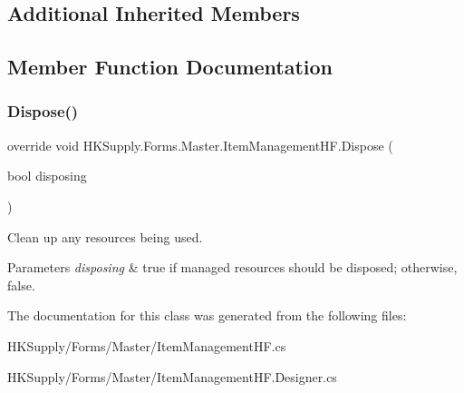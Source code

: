 \subsection*{Additional Inherited Members}


\subsection{Member Function Documentation}
\mbox{\label{class_h_k_supply_1_1_forms_1_1_master_1_1_item_management_h_f_a5110e62d48874b23703c69ef3d70e727}} 
\subsubsection{\texorpdfstring{Dispose()}{Dispose()}}
{\footnotesize\ttfamily override void H\+K\+Supply.\+Forms.\+Master.\+Item\+Management\+H\+F.\+Dispose (\begin{DoxyParamCaption}\item[{bool}]{disposing }\end{DoxyParamCaption})\hspace{0.3cm}{\ttfamily [protected]}}



Clean up any resources being used. 


\begin{DoxyParams}{Parameters}
{\em disposing} & true if managed resources should be disposed; otherwise, false.\\
\hline
\end{DoxyParams}


The documentation for this class was generated from the following files\+:\begin{DoxyCompactItemize}
\item 
H\+K\+Supply/\+Forms/\+Master/Item\+Management\+H\+F.\+cs\item 
H\+K\+Supply/\+Forms/\+Master/Item\+Management\+H\+F.\+Designer.\+cs\end{DoxyCompactItemize}
